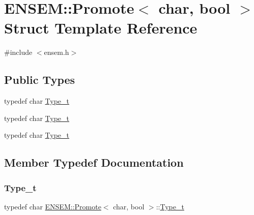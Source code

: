 \hypertarget{structENSEM_1_1Promote_3_01char_00_01bool_01_4}{}\section{E\+N\+S\+EM\+:\+:Promote$<$ char, bool $>$ Struct Template Reference}
\label{structENSEM_1_1Promote_3_01char_00_01bool_01_4}


{\ttfamily \#include $<$ensem.\+h$>$}

\subsection*{Public Types}
\begin{DoxyCompactItemize}
\item 
typedef char \mbox{\hyperlink{structENSEM_1_1Promote_3_01char_00_01bool_01_4_ad5b22f8f15e29245a56d9411fafedb3b}{Type\+\_\+t}}
\item 
typedef char \mbox{\hyperlink{structENSEM_1_1Promote_3_01char_00_01bool_01_4_ad5b22f8f15e29245a56d9411fafedb3b}{Type\+\_\+t}}
\item 
typedef char \mbox{\hyperlink{structENSEM_1_1Promote_3_01char_00_01bool_01_4_ad5b22f8f15e29245a56d9411fafedb3b}{Type\+\_\+t}}
\end{DoxyCompactItemize}


\subsection{Member Typedef Documentation}
\mbox{\label{structENSEM_1_1Promote_3_01char_00_01bool_01_4_ad5b22f8f15e29245a56d9411fafedb3b}} 
\subsubsection{\texorpdfstring{Type\_t}{Type\_t}\hspace{0.1cm}{\footnotesize\ttfamily [1/3]}}
{\footnotesize\ttfamily typedef char \mbox{\hyperlink{structENSEM_1_1Promote}{E\+N\+S\+E\+M\+::\+Promote}}$<$ char, bool $>$\+::\mbox{\hyperlink{structENSEM_1_1Promote_3_01char_00_01bool_01_4_ad5b22f8f15e29245a56d9411fafedb3b}{Type\+\_\+t}}}

\mbox{\label{structENSEM_1_1Promote_3_01char_00_01bool_01_4_ad5b22f8f15e29245a56d9411fafedb3b}} 
